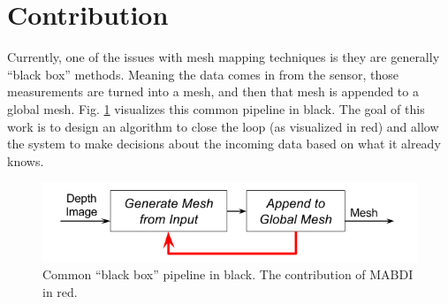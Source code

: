 \section{Contribution} \label{section:introduction:contribution}

Currently, one of the issues with mesh mapping techniques is they are generally
``black box'' methods. Meaning the data comes in from the sensor, those
measurements are turned into a mesh, and then that mesh is appended to a global
mesh. Fig. \ref{fig:pipeline} visualizes this common pipeline in black. The goal
of this work is to design an algorithm to close the loop (as visualized in red)
and allow the system to make decisions about the incoming data based on what it
already knows.

\begin{figure}[h]%
\centering
  \includegraphics[width=.75\textwidth]{figures/diagram_general_pipeline.png}
  \caption{Common ``black box'' pipeline in black. The contribution of MABDI in red.}
  \label{fig:pipeline}
\end{figure}
